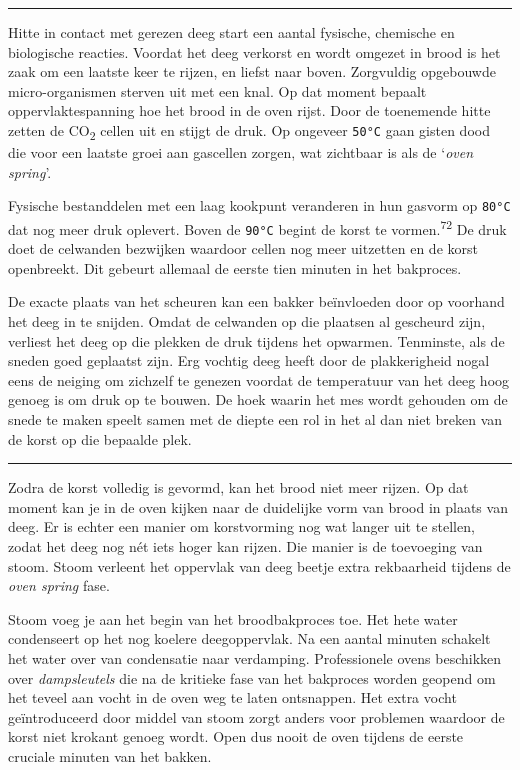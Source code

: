 \documentclass[
  11pt,
  dutch,
]{memoir}
\begin{document}
\pfbreak

Hitte in contact met gerezen deeg start een aantal fysische, chemische
en biologische reacties. Voordat het deeg verkorst en wordt omgezet in
brood is het zaak om een laatste keer te rijzen, en liefst naar boven.
Zorgvuldig opgebouwde micro-organismen sterven uit met een knal. Op dat
moment bepaalt oppervlaktespanning hoe het brood in de oven rijst. Door
de toenemende hitte zetten de CO\textsubscript{2} cellen uit en stijgt
de druk. Op ongeveer \texttt{50°C} gaan gisten dood die voor een laatste
groei aan gascellen zorgen, wat zichtbaar is als de `\emph{oven
spring}'.

Fysische bestanddelen met een laag kookpunt veranderen in hun gasvorm op
\texttt{80°C} dat nog meer druk oplevert. Boven de \texttt{90°C} begint
de korst te vormen.\textsuperscript{72} De druk doet de celwanden
bezwijken waardoor cellen nog meer uitzetten en de korst openbreekt. Dit
gebeurt allemaal de eerste tien minuten in het bakproces.

De exacte plaats van het scheuren kan een bakker beïnvloeden door op
voorhand het deeg in te snijden. Omdat de celwanden op die plaatsen al
gescheurd zijn, verliest het deeg op die plekken de druk tijdens het
opwarmen. Tenminste, als de sneden goed geplaatst zijn. Erg vochtig deeg
heeft door de plakkerigheid nogal eens de neiging om zichzelf te genezen
voordat de temperatuur van het deeg hoog genoeg is om druk op te bouwen.
De hoek waarin het mes wordt gehouden om de snede te maken speelt samen
met de diepte een rol in het al dan niet breken van de korst op die
bepaalde plek.

\pfbreak

Zodra de korst volledig is gevormd, kan het brood niet meer rijzen. Op
dat moment kan je in de oven kijken naar de duidelijke vorm van brood in
plaats van deeg. Er is echter een manier om korstvorming nog wat langer
uit te stellen, zodat het deeg nog nét iets hoger kan rijzen. Die manier
is de toevoeging van stoom. Stoom verleent het oppervlak van deeg beetje
extra rekbaarheid tijdens de \emph{oven spring} fase.

Stoom voeg je aan het begin van het broodbakproces toe. Het hete water
condenseert op het nog koelere deegoppervlak. Na een aantal minuten
schakelt het water over van condensatie naar verdamping. Professionele
ovens beschikken over \emph{dampsleutels} die na de kritieke fase van
het bakproces worden geopend om het teveel aan vocht in de oven weg te
laten ontsnappen. Het extra vocht geïntroduceerd door middel van stoom
zorgt anders voor problemen waardoor de korst niet krokant genoeg wordt.
Open dus nooit de oven tijdens de eerste cruciale minuten van het
bakken.
\end{document}
